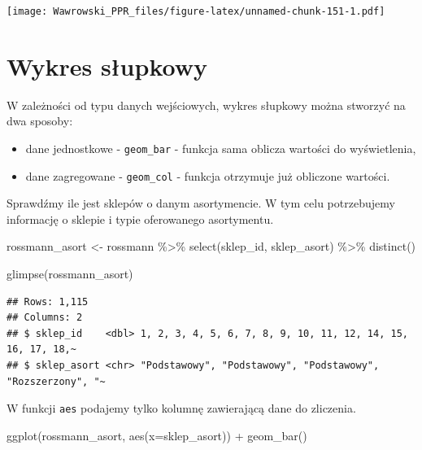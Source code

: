 \documentclass[
]{book}
\newenvironment{Shaded}{\begin{snugshade}}{\end{snugshade}}
\newcommand{\AttributeTok}[1]{\textcolor[rgb]{0.77,0.63,0.00}{#1}}
\newcommand{\FunctionTok}[1]{\textcolor[rgb]{0.00,0.00,0.00}{#1}}
\newcommand{\NormalTok}[1]{#1}
\newcommand{\OtherTok}[1]{\textcolor[rgb]{0.56,0.35,0.01}{#1}}
\newcommand{\SpecialCharTok}[1]{\textcolor[rgb]{0.00,0.00,0.00}{#1}}
\providecommand{\tightlist}{%
  \setlength{\itemsep}{0pt}\setlength{\parskip}{0pt}}
\begin{document}
\texttt{[image: Wawrowski\_PPR\_files/figure-latex/unnamed-chunk-151-1.pdf]}

\hypertarget{wykres-sux142upkowy}{%
\section{Wykres słupkowy}\label{wykres-sux142upkowy}}

W zależności od typu danych wejściowych, wykres słupkowy można stworzyć na dwa sposoby:

\begin{itemize}
\tightlist
\item
  dane jednostkowe - \texttt{geom\_bar} - funkcja sama oblicza wartości do wyświetlenia,
\item
  dane zagregowane - \texttt{geom\_col} - funkcja otrzymuje już obliczone wartości.
\end{itemize}

Sprawdźmy ile jest sklepów o danym asortymencie. W tym celu potrzebujemy informację o sklepie i typie oferowanego asortymentu.

\begin{Shaded}
\begin{Highlighting}[]
\NormalTok{rossmann\_asort }\OtherTok{\textless{}{-}}\NormalTok{ rossmann }\SpecialCharTok{\%\textgreater{}\%}
  \FunctionTok{select}\NormalTok{(sklep\_id, sklep\_asort) }\SpecialCharTok{\%\textgreater{}\%}
  \FunctionTok{distinct}\NormalTok{()}

\FunctionTok{glimpse}\NormalTok{(rossmann\_asort)}
\end{Highlighting}
\end{Shaded}

\begin{verbatim}
## Rows: 1,115
## Columns: 2
## $ sklep_id    <dbl> 1, 2, 3, 4, 5, 6, 7, 8, 9, 10, 11, 12, 14, 15, 16, 17, 18,~
## $ sklep_asort <chr> "Podstawowy", "Podstawowy", "Podstawowy", "Rozszerzony", "~
\end{verbatim}

W funkcji \texttt{aes} podajemy tylko kolumnę zawierającą dane do zliczenia.

\begin{Shaded}
\begin{Highlighting}[]
\FunctionTok{ggplot}\NormalTok{(rossmann\_asort, }\FunctionTok{aes}\NormalTok{(}\AttributeTok{x=}\NormalTok{sklep\_asort)) }\SpecialCharTok{+}
  \FunctionTok{geom\_bar}\NormalTok{()}
\end{Highlighting}
\end{Shaded}
\end{document}
